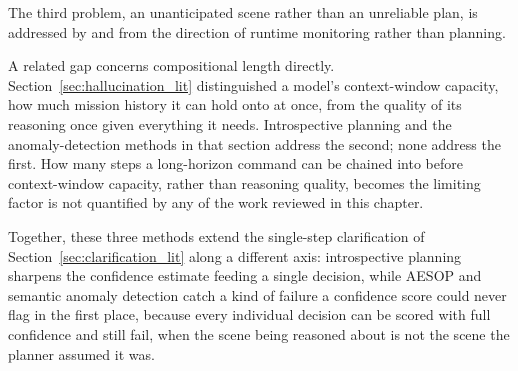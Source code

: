 
The third problem, an unanticipated scene rather than an unreliable plan,
is addressed by \citet{sinha2024aesop} and \citet{elhafsi2023semantic} from the
 direction of runtime monitoring rather than planning.



A related gap concerns compositional length directly. Section~\ref{sec:hallucination_lit}
distinguished a model's context-window capacity, how much mission history it can hold onto at
once, from the quality of its reasoning once given everything it needs. Introspective planning
and the anomaly-detection methods in that section address the second; none address the first. How
many steps a long-horizon command can be chained into before context-window capacity, rather than
reasoning quality, becomes the limiting factor is not quantified by any of the work reviewed in
this chapter.



Together, these three methods extend the single-step clarification of
Section~\ref{sec:clarification_lit} along a different axis: introspective planning sharpens the
confidence estimate feeding a single decision, while AESOP and semantic anomaly detection catch a
kind of failure a confidence score could never flag in the first place, because every individual
decision can be scored with full confidence and still fail, when the scene being reasoned about is
not the scene the planner assumed it was.


